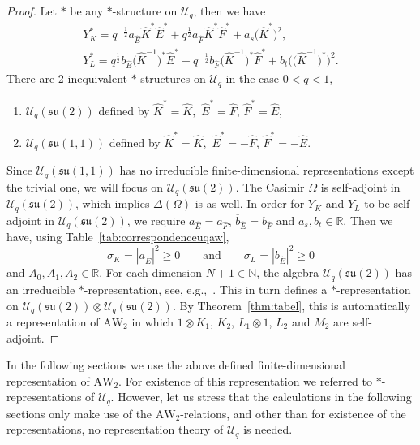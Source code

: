\documentclass[pdftex]{sigma}
\numberwithin{equation}{section}
\newcommand{\RR}{\mathbb{R}}
\newcommand{\NN}{\mathbb{N}}
\newcommand{\AW}[1]{\mathrm{AW}_{#1}}
\newcommand{\half}{\frac{1}{2}}
\newcommand{\uq}{\mathcal{U}_q(\mathfrak{su}(2))}
\newcommand{\Uq}{\mathcal{U}_q}
\newcommand{\uqeen}{\mathcal{U}_q(\mathfrak{su}(1,\!1))}
\begin{document}
\begin{proof}
	Let $*$ be any $*$-structure on $\Uq$, then we have
	\begin{gather*}
		Y_K^*=q^{-\half} \overline{a}_{\hat{E}} \hat{K}^*\hat{E}^*+ q^{\half}\overline{a}_{\hat{F}} \hat{K}^*\hat{F}^* + \overline{a}_s \big(\hat{K}^*\big)^2,\\
		Y_{L}^* =q^{\half} \overline{b}_{\hat{E}} \big(\hat{K}^{-1}\big)^*\hat{E}^*+ q^{-\half} \overline{b}_{\hat{F}} \big(\hat{K}^{-1}\big)^*\hat{F}^* + \overline{b}_t \big(\big(\hat{K}^{-1}\big)^*\big)^2.
	\end{gather*}
	There are 2 inequivalent $*$-structures on $\Uq$ in the case $0<q<1$,
	\begin{enumerate}\itemsep=0pt
		\item[(i)] $\uq$ defined by $\hat{K}^*=\hat{K},$ $\hat{E}^*=\hat{F}$, $\hat{F}^*=\hat{E}$,
		\item[(ii)] $\uqeen$ defined by $\hat{K}^*=\hat{K},$ $\hat{E}^*=-\hat{F}$, $\hat{F}^*=-\hat{E}$.
	\end{enumerate}
	Since $\uqeen$ has no irreducible finite-dimensional representations except the trivial one, we will focus on $\uq$. The Casimir $\Omega$ is self-adjoint in $\uq$, which implies $\Delta(\Omega)$ is as well. In order for $Y_K$ and $Y_L$ to be self-adjoint in $\uq$, we require 	$\overline{a}_{\hat{E}} = a_{\hat{F}}$, $\overline{b}_{\hat{E}}=b_{\hat{F}}$ and $a_s,b_t\in\RR$. Then we have, using Table~\ref{tab:correspondenceuqaw},
	\[
	\sigma_K=|a_{\hat{E}}|^2 \geq 0\qquad \text{and}\qquad \sigma_L=|b_{\hat{E}}|^2 \geq 0
	\]
	and $A_0,A_1,A_2\in\RR$. For each dimension $N+1\in\NN$, the algebra $\uq$ has an irreducible $*$-representation, see, e.g.,~\cite{Koelink1996}. This in turn defines a $*$-representation on $\uq\otimes \uq$. By Theorem~\ref{thm:tabel}, this is automatically a representation of $\AW{2}$ in which $1\otimes K_1$, $K_2$, $L_1\otimes 1$, $L_2$ and $M_2$ are self-adjoint.	
\end{proof}

\begin{Remark}In the following sections we use the above defined finite-dimensional representation of $\AW{2}$. For existence of this representation we referred to $*$-representations of $\Uq$. However, let us stress that the calculations in the following sections only make use of the $\AW{2}$-relations, and other than for existence of the representations, no representation theory of $\Uq$ is needed.
\end{Remark}
\end{document}
